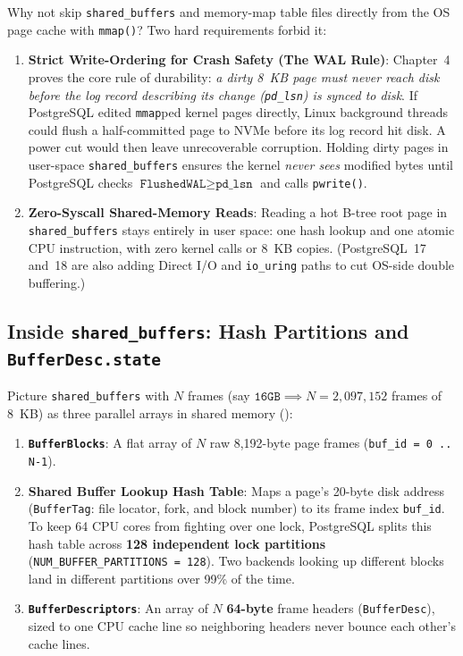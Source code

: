 Why not skip \texttt{shared\_buffers} and memory-map table files directly from the OS page cache with \texttt{mmap()}? Two hard requirements forbid it:
\begin{enumerate}
  \item \textbf{Strict Write-Ordering for Crash Safety (The WAL Rule)}: Chapter~4 proves the core rule of durability: \emph{a dirty 8~KB page must never reach disk before the log record describing its change (\texttt{pd\_lsn}) is synced to disk}. If PostgreSQL edited \texttt{mmap}ped kernel pages directly, Linux background threads could flush a half-committed page to NVMe before its log record hit disk. A power cut would then leave unrecoverable corruption. Holding dirty pages in user-space \texttt{shared\_buffers} ensures the kernel \emph{never sees} modified bytes until PostgreSQL checks $\texttt{FlushedWAL} \ge \texttt{pd\_lsn}$ and calls \texttt{pwrite()}.
  \item \textbf{Zero-Syscall Shared-Memory Reads}: Reading a hot B-tree root page in \texttt{shared\_buffers} stays entirely in user space: one hash lookup and one atomic CPU instruction, with zero kernel calls or 8~KB copies. (PostgreSQL~17 and~18 are also adding Direct I/O and \texttt{io\_uring} paths to cut OS-side double buffering.)
\end{enumerate}

\subsection{Inside \texttt{shared\_buffers}: Hash Partitions and \texttt{BufferDesc.state}}

Picture \texttt{shared\_buffers} with $N$ frames (say $\texttt{16GB} \implies N = 2{,}097{,}152$ frames of 8~KB) as three parallel arrays in shared memory ():
\begin{enumerate}
  \item \textbf{\texttt{BufferBlocks}}: A flat array of $N$ raw 8,192-byte page frames (\texttt{buf\_id = 0 .. N-1}).
  \item \textbf{Shared Buffer Lookup Hash Table}: Maps a page's 20-byte disk address (\texttt{BufferTag}: file locator, fork, and block number) to its frame index \texttt{buf\_id}. To keep 64 CPU cores from fighting over one lock, PostgreSQL splits this hash table across \textbf{128 independent lock partitions} (\texttt{NUM\_BUFFER\_PARTITIONS = 128}). Two backends looking up different blocks land in different partitions over 99\% of the time.
  \item \textbf{\texttt{BufferDescriptors}}: An array of $N$ \textbf{64-byte} frame headers (\texttt{BufferDesc}), sized to one CPU cache line so neighboring headers never bounce each other's cache lines.
\end{enumerate}

